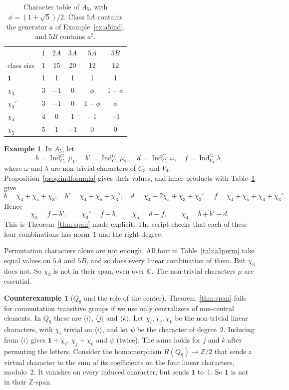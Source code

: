 \documentclass[12pt,letterpaper]{article}
\numberwithin{equation}{section}
\theoremstyle{plain}
\theoremstyle{definition}
\newtheorem{example}[theorem]{Example}
\newtheorem{counterexample}[theorem]{Counterexample}
\newcommand{\Z}{\mathbb{Z}}
\newcommand{\C}{\mathbb{C}}
\DeclareMathOperator{\Ind}{Ind}
\newcommand{\triv}{\mathbf{1}}
\begin{document}
\begin{table}[ht]
\centering
\caption{Character table of $A_5$, with $\phi=(1+\sqrt5)/2$. Class $5A$
contains the generator $a$ of Example~\ref{ex:a5ind}, and $5B$ contains
$a^2$.}\label{tab:a5}
\begin{tabular}{lccccc}
\toprule
& $1$ & $2A$ & $3A$ & $5A$ & $5B$\\
class size & 1 & 15 & 20 & 12 & 12\\
\midrule
$\triv$ & 1 & 1 & 1 & 1 & 1\\
$\chi_3$ & 3 & $-1$ & 0 & $\phi$ & $1-\phi$\\
$\chi_3'$ & 3 & $-1$ & 0 & $1-\phi$ & $\phi$\\
$\chi_4$ & 4 & 0 & 1 & $-1$ & $-1$\\
$\chi_5$ & 5 & 1 & $-1$ & 0 & 0\\
\bottomrule
\end{tabular}
\end{table}

\begin{example}\label{ex:a5span}
In $A_5$, let
\[
b=\Ind_{C_5}^G\mu_1,\quad b'=\Ind_{C_5}^G\mu_2,\quad
d=\Ind_{C_3}^G\omega,\quad f=\Ind_{V_4}^G\lambda,
\]
where $\omega$ and $\lambda$ are non-trivial characters of $C_3$ and $V_4$.
Proposition~\ref{prop:indformula} gives their values, and inner products
with Table~\ref{tab:a5} give
\[
b=\chi_4+\chi_5+\chi_3,\quad b'=\chi_4+\chi_5+\chi_3',\quad
d=\chi_4+2\chi_5+\chi_3+\chi_3',\quad f=\chi_4+\chi_5+\chi_3+\chi_3'.
\]
Hence
\[
\chi_3=f-b',\qquad\chi_3'=f-b,\qquad\chi_5=d-f,\qquad\chi_4=b+b'-d.
\]
This is Theorem~\ref{thm:span} made explicit. The script checks that each
of these four combinations has norm~$1$ and the right degree.

Permutation characters alone are not enough. All four in
Table~\ref{tab:a5perm} take equal values on $5A$ and $5B$, and so does every
linear combination of them. But $\chi_3$ does not. So $\chi_3$ is not in
their span, even over $\C$. The non-trivial characters $\mu$ are
essential.
\end{example}

\begin{counterexample}[$Q_8$ and the role of the center]\label{cex:q8}
Theorem~\ref{thm:span} fails for commutation transitive groups if we use
only centralizers of non-central elements. In $Q_8$ these are
$\langle i\rangle$, $\langle j\rangle$ and $\langle k\rangle$. Let
$\chi_i,\chi_j,\chi_k$ be the non-trivial linear characters, with $\chi_i$
trivial on $\langle i\rangle$, and let $\psi$ be the character of
degree~$2$. Inducing from $\langle i\rangle$ gives $\triv+\chi_i$,
$\chi_j+\chi_k$ and $\psi$ (twice). The same holds for $j$ and $k$ after
permuting the letters. Consider the homomorphism $R(Q_8)\to\Z/2$ that sends
a virtual character to the sum of its coefficients on the four linear
characters, modulo~$2$. It vanishes on every induced character, but sends
$\triv$ to~$1$. So $\triv$ is not in their $\Z$-span.
\end{counterexample}
\end{document}
